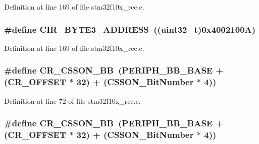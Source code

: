 Definition at line 169 of file stm32f10x\+\_\+rcc.\+c.

\subsubsection[{\texorpdfstring{C\+I\+R\+\_\+\+B\+Y\+T\+E3\+\_\+\+A\+D\+D\+R\+E\+SS}{CIR_BYTE3_ADDRESS}}]{\setlength{\rightskip}{0pt plus 5cm}\#define C\+I\+R\+\_\+\+B\+Y\+T\+E3\+\_\+\+A\+D\+D\+R\+E\+SS~(({\bf uint32\+\_\+t})0x4002100\+A)}\hypertarget{group___r_c_c___private___defines_ga43f47430582c9575970901533e525bb5}{}\label{group___r_c_c___private___defines_ga43f47430582c9575970901533e525bb5}


Definition at line 169 of file stm32f10x\+\_\+rcc.\+c.

\subsubsection[{\texorpdfstring{C\+R\+\_\+\+C\+S\+S\+O\+N\+\_\+\+BB}{CR_CSSON_BB}}]{\setlength{\rightskip}{0pt plus 5cm}\#define C\+R\+\_\+\+C\+S\+S\+O\+N\+\_\+\+BB~({\bf P\+E\+R\+I\+P\+H\+\_\+\+B\+B\+\_\+\+B\+A\+SE} + ({\bf C\+R\+\_\+\+O\+F\+F\+S\+ET} $\ast$ 32) + ({\bf C\+S\+S\+O\+N\+\_\+\+Bit\+Number} $\ast$ 4))}\hypertarget{group___r_c_c___private___defines_gaca914aed10477ae4090fea0a9639b1ea}{}\label{group___r_c_c___private___defines_gaca914aed10477ae4090fea0a9639b1ea}


Definition at line 72 of file stm32f10x\+\_\+rcc.\+c.

\subsubsection[{\texorpdfstring{C\+R\+\_\+\+C\+S\+S\+O\+N\+\_\+\+BB}{CR_CSSON_BB}}]{\setlength{\rightskip}{0pt plus 5cm}\#define C\+R\+\_\+\+C\+S\+S\+O\+N\+\_\+\+BB~({\bf P\+E\+R\+I\+P\+H\+\_\+\+B\+B\+\_\+\+B\+A\+SE} + ({\bf C\+R\+\_\+\+O\+F\+F\+S\+ET} $\ast$ 32) + ({\bf C\+S\+S\+O\+N\+\_\+\+Bit\+Number} $\ast$ 4))}\hypertarget{group___r_c_c___private___defines_gaca914aed10477ae4090fea0a9639b1ea}{}\label{group___r_c_c___private___defines_gaca914aed10477ae4090fea0a9639b1ea}


